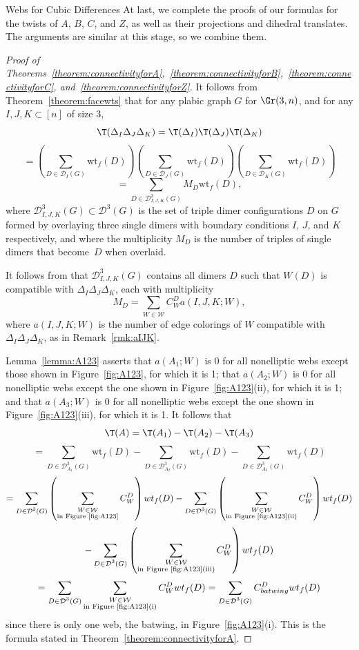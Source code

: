\begin{subsection}{Webs for Cubic Differences}
At last, we complete the proofs of our formulas for the twists of $A$, $B$, $C$, and $Z$, as well as their projections and dihedral translates. The arguments are similar at this stage, so we combine them.
\begin{proof}[Proof of Theorems~\ref{theorem:connectivityforA},~\ref{theorem:connectivityforB},~\ref{theorem:connectivityforC}, and~\ref{theorem:connectivityforZ}]
It follows from Theorem~\ref{theorem:facewts} that for any plabic graph $G$ for $\Gr(3,n)$, and for any $I,J,K \subset [n]$ of size 3,
\[\T(\Delta_I\Delta_J\Delta_K) =\T(\Delta_I)\T(\Delta_J)\T(\Delta_K)\]
\[= \left(\sum_{D \in \mathcal{D}_I(G)} \text{wt}_f(D)\right)\left(\sum_{D \in \mathcal{D}_J(G)} \text{wt}_f(D)\right)\left(\sum_{D \in \mathcal{D}_K(G)} \text{wt}_f(D)\right)\]
\[=\sum_{D \in \mathcal{D}_{I,J,K}^3(G)} M_D\text{wt}_f(D),\]
where $\mathcal{D}_{I,J,K}^3(G) \subset \mathcal{D}^3(G)$ is the set of triple dimer configurations $D$ on $G$ formed by overlaying three single dimers with boundary conditions $I$, $J$, and $K$ respectively, and where the multiplicity $M_D$ is the number of triples of single dimers that become~$D$ when overlaid.

It follows from \cite[Lemma 4.12]{lam2015} that $\mathcal{D}_{I,J,K}^3(G)$ contains all dimers $D$ such that $W(D)$ is compatible with $\Delta_I\Delta_J\Delta_K$, each with multiplicity
\[M_D=\sum_{W \in \mathcal{W}} C^D_{W} a(I,J,K;W),\]
where $a(I,J,K;W)$ is the number of edge colorings of $W$ compatible with $\Delta_I\Delta_J\Delta_K$, as in Remark~\ref{rmk:aIJK}.

Lemma~\ref{lemma:A123} asserts that $a(A_1;W)$ is 0 for all nonelliptic webs except those shown in Figure~\ref{fig:A123}, for which it is 1; that $a(A_2;W)$ is 0 for all nonelliptic webs except the one shown in Figure~\ref{fig:A123}(ii), for which it is 1; and that $a(A_3;W)$ is 0 for all nonelliptic webs except the one shown in Figure~\ref{fig:A123}(iii), for which it is 1. It follows that
\[\T(A)=\T(A_1)-\T(A_2)-\T(A_3)\]\[=\sum_{D \in \mathcal{D}_{A_1}^3(G)} \text{wt}_f(D)-\sum_{D \in \mathcal{D}_{A_2}^3(G)} \text{wt}_f(D)-\sum_{D \in \mathcal{D}_{A_3}^3(G)} \text{wt}_f(D)\]
\[= \sum_{\substack{D \in \mathcal{D}^3(G)}} \left(\sum_{\substack{W \in \mathcal{W}\\\text{in Figure~\ref{fig:A123}}}} C^D_{W}\right) wt_f(D)- \sum_{\substack{D \in \mathcal{D}^3(G)}} \left(\sum_{\substack{W \in \mathcal{W}\\\text{in Figure~\ref{fig:A123}(ii)}}} C^D_{W} \right)wt_f(D)\]\[- \sum_{\substack{D \in \mathcal{D}^3(G)}} \left(\sum_{\substack{W \in \mathcal{W}\\\text{in Figure~\ref{fig:A123}(iii)}}} C^D_{W}\right) wt_f(D)\]
\[= \sum_{\substack{D \in \mathcal{D}^3(G)}} \sum_{\substack{W \in \mathcal{W}\\\text{in Figure~\ref{fig:A123}(i)}}} C^D_{W}wt_f(D) = \sum_{\substack{D \in \mathcal{D}^3(G)}} C^D_{batwing}wt_f(D)\]
since there is only one web, the batwing, in Figure~\ref{fig:A123}(i). This is the formula stated in Theorem~\ref{theorem:connectivityforA}.


\end{proof}
\end{subsection}
